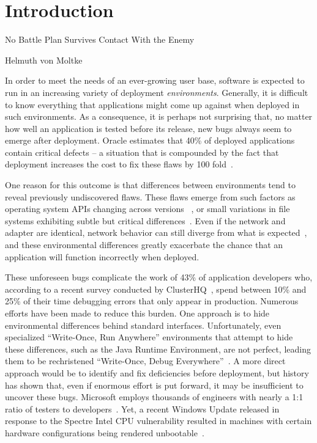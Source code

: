 \chapter{Introduction}
\label{chap:intro}

\epigraph{No Battle Plan Survives Contact With the Enemy}{Helmuth von Moltke}

In order to meet the needs of an ever-growing user base,
software is expected to run in an increasing variety of deployment \emph{environments}. Generally, it is difficult to know everything that applications might come up against when deployed in such environments. As a consequence, it is perhaps not surprising that, no matter how well an application is tested before its release,
new bugs always seem to emerge after deployment.
Oracle estimates that 40\% of deployed applications
contain critical defects -- a situation that is compounded
by the fact that deployment
increases the cost to fix these flaws by 100 fold~\cite{OracleAppQuality}.

One reason for this outcome
is that differences between environments tend to
reveal previously undiscovered flaws.
These flaws emerge from
such factors as
operating system APIs changing across versions
~\cite{LinuxGlibcChanges, WinAPICompat, MuslDifferences},
or small variations in file systems exhibiting subtle but critical
differences~\cite{EXT4Layout, AppleHFS, WindowsNTFS}.
Even if the network and adapter are identical,
network behavior can still diverge from what is expected~\cite{vbox,
NMAPOSDifferences, VMWareNATFailure},
and these environmental differences greatly exacerbate
the chance that an application will function incorrectly when deployed.

These unforeseen bugs
complicate the work of 43\% of application developers who, according to a
recent survey conducted by ClusterHQ~\cite{ClusterHQSurvey},
spend between 10\% and 25\% of their time
debugging errors that only appear in production.
Numerous efforts have been made to reduce this burden.
One approach
is to hide environmental differences behind standard interfaces.
Unfortunately,
even specialized ``Write-Once, Run Anywhere'' environments
that attempt to hide these differences,
such as the Java Runtime Environment,
are not perfect,
leading them to be rechristened ``Write-Once, Debug Everywhere''~\cite{WODE}.
A more direct approach would be
to identify and fix deficiencies before deployment,
but history has shown that,
even if enormous effort is put forward,
it may be insufficient to uncover these bugs.
Microsoft employs thousands of engineers with nearly a
1:1 ratio of testers to developers~\cite{Page2009}.
Yet, a recent Windows Update released
in response to the Spectre Intel CPU vulnerability
resulted in machines with certain hardware configurations
being rendered unbootable~\cite{kb4056892}.

